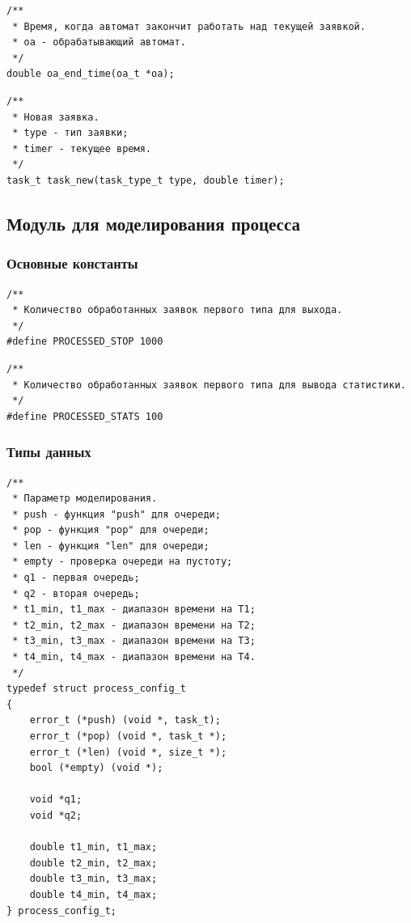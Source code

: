 \documentclass[a4paper,12pt]{extarticle}
\begin{document}
\begin{verbatim}
/**
 * Время, когда автомат закончит работать над текущей заявкой.
 * oa - обрабатывающий автомат.
 */
double oa_end_time(oa_t *oa);
\end{verbatim}

\begin{verbatim}
/**
 * Новая заявка.
 * type - тип заявки;
 * timer - текущее время.
 */
task_t task_new(task_type_t type, double timer);
\end{verbatim}

\subsection{Модуль для моделирования процесса}

\subsubsection{Основные константы}
\begin{verbatim}
/**
 * Количество обработанных заявок первого типа для выхода.
 */
#define PROCESSED_STOP 1000
\end{verbatim}

\begin{verbatim}
/**
 * Количество обработанных заявок первого типа для вывода статистики.
 */
#define PROCESSED_STATS 100
\end{verbatim}


\subsubsection{Типы данных}
\begin{verbatim}
/**
 * Параметр моделирования.
 * push - функция "push" для очереди;
 * pop - функция "pop" для очереди;
 * len - функция "len" для очереди;
 * empty - проверка очереди на пустоту;
 * q1 - первая очередь;
 * q2 - вторая очередь;
 * t1_min, t1_max - диапазон времени на T1;
 * t2_min, t2_max - диапазон времени на T2;
 * t3_min, t3_max - диапазон времени на T3;
 * t4_min, t4_max - диапазон времени на T4.
 */
typedef struct process_config_t
{
    error_t (*push) (void *, task_t);
    error_t (*pop) (void *, task_t *);
    error_t (*len) (void *, size_t *);
    bool (*empty) (void *);

    void *q1;
    void *q2;

    double t1_min, t1_max;
    double t2_min, t2_max;
    double t3_min, t3_max;
    double t4_min, t4_max;
} process_config_t;
\end{verbatim}
\end{document}
